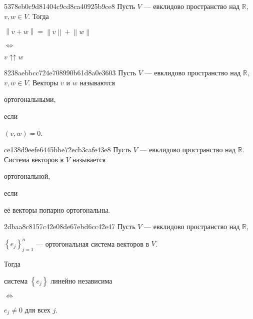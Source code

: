 \begin{note}{5378eb0c9d81404c9cd8ca40925b9ce8}
    Пусть \({ V }\) --- евклидово пространство над \({ \mathbb R }\),\: \({ v, w \in V }\).
    Тогда
    \begin{center}
        \({ \left\lVert v + w \right\rVert = \left\lVert v \right\rVert + \left\lVert w \right\rVert }\)
        \begin{icloze}{2}\({ \iff }\) \end{icloze}
        \begin{icloze}{1}\({ v \operatorname{\uparrow\uparrow} w }\)\end{icloze}
    \end{center}
\end{note}

\begin{note}{8238aebbcc724e708990b61d8a0e3603}
    Пусть \({ V }\) --- евклидово пространство над \({ \mathbb R }\),\: \({ v, w \in V }\).
    Векторы \({ v }\) и \({ w }\) называются \begin{icloze}{2}ортогональными,\end{icloze} если \begin{icloze}{1}\({ (v, w) = 0 }\).\end{icloze}
\end{note}

\begin{note}{ce138d9eefe6445bbe72ecb3cafe43e8}
    Пусть \({ V }\) --- евклидово пространство над \({ \mathbb R }\).
    Система векторов в \({ V }\) называется \begin{icloze}{2}ортогональной,\end{icloze} если \begin{icloze}{1}её векторы попарно ортогональны.\end{icloze}
\end{note}

\begin{note}{2dbaa8c8157c42e08de67ebd6cc42e47}
    Пусть \({ V }\) --- евклидово пространство над \({ \mathbb R }\),\: \begin{icloze}{4}\({ \left\{ e_j \right\}_{j = 1}^{n} }\) --- ортогональная система векторов в \({ V }\).\end{icloze}
    Тогда \begin{icloze}{3}система \({ \left\{ e_j \right\} }\) линейно независима\end{icloze} \begin{icloze}{2}\({ \iff }\)\end{icloze} \begin{icloze}{1}\({ e_j \neq 0 }\) для всех \({ j }\).\end{icloze}
\end{note}

